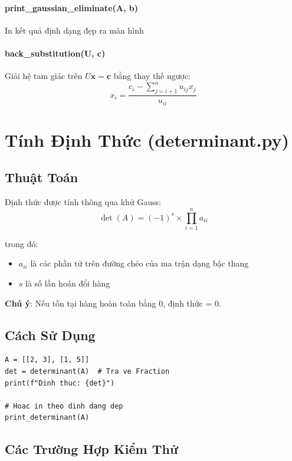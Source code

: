 \documentclass[12pt, a4paper, twoside]{article}
\begin{document}
\paragraph{print\_gaussian\_eliminate(A, b)}
In kết quả định dạng đẹp ra màn hình

\paragraph{back\_substitution(U, c)}
Giải hệ tam giác trên $U\mathbf{x} = \mathbf{c}$ bằng thay thế ngược:
\[
x_i = \frac{c_i - \sum_{j=i+1}^{n} u_{ij} x_j}{u_{ii}}
\]

\newpage

\section{Tính Định Thức (determinant.py)}

\subsection{Thuật Toán}

Định thức được tính thông qua khử Gauss:
\[
\det(A) = (-1)^{s} \times \prod_{i=1}^{n} a_{ii}
\]

trong đó:
\begin{itemize}
    \item $a_{ii}$ là các phần tử trên đường chéo của ma trận dạng bậc thang
    \item $s$ là số lần hoán đổi hàng
\end{itemize}

\textbf{Chú ý}: Nếu tồn tại hàng hoàn toàn bằng 0, định thức = 0.

\subsection{Cách Sử Dụng}

\begin{lstlisting}
A = [[2, 3], [1, 5]]
det = determinant(A)  # Tra ve Fraction
print(f"Dinh thuc: {det}")

# Hoac in theo dinh dang dep
print_determinant(A)
\end{lstlisting}

\subsection{Các Trường Hợp Kiểm Thử}
\end{document}
